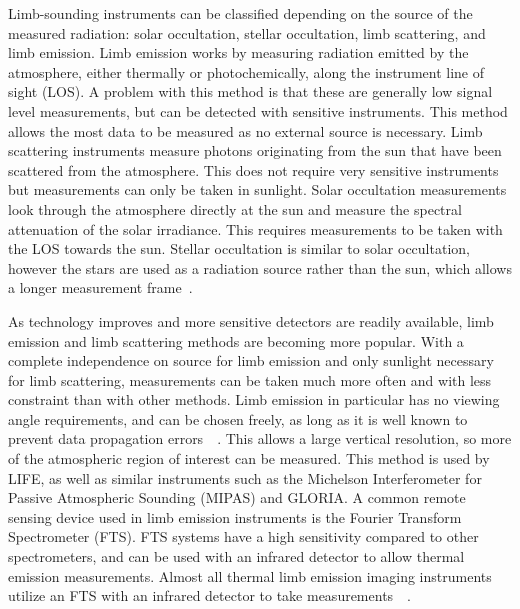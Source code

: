 Limb-sounding instruments can be classified depending on the source of the measured radiation: solar occultation, stellar occultation, limb scattering, and limb emission. Limb emission works by measuring radiation emitted by the atmosphere, either thermally or photochemically, along the instrument line of sight (LOS). A problem with this method is that these are generally low signal level measurements, but can be detected with sensitive instruments. This method allows the most data to be measured as no external source is necessary. Limb scattering instruments measure photons originating from the sun that have been scattered from the atmosphere. This does not require very sensitive instruments but measurements can only be taken in sunlight. Solar occultation measurements look through the atmosphere directly at the sun and measure the spectral attenuation of the solar irradiance. This requires measurements to be taken with the LOS towards the sun. Stellar occultation is similar to solar occultation, however the stars are used as a radiation source rather than the sun, which allows a longer measurement frame~\citep{SPARC}.

As technology improves and more sensitive detectors are readily available, limb emission and limb scattering methods are becoming more popular. With a complete independence on source for limb emission and only sunlight necessary for limb scattering, measurements can be taken much more often and with less constraint than with other methods. Limb emission in particular has no viewing angle requirements, and can be chosen freely, as long as it is well known to prevent data propagation errors~\citep{IR_limb_emission_measurements}~\citep{SPARC}. This allows a large vertical resolution, so more of the atmospheric region of interest can be measured. This method is used by LIFE, as well as similar instruments such as the Michelson Interferometer for Passive Atmospheric Sounding (MIPAS) and GLORIA. A common remote sensing device used in limb emission instruments is the Fourier Transform Spectrometer (FTS). FTS systems have a high sensitivity compared to other spectrometers, and can be used with an infrared detector to allow thermal emission measurements. Almost all thermal limb emission imaging instruments utilize an FTS with an infrared detector to take measurements~\citep{GLORIA_concept}~\citep{MIPAS_instrument}. 

